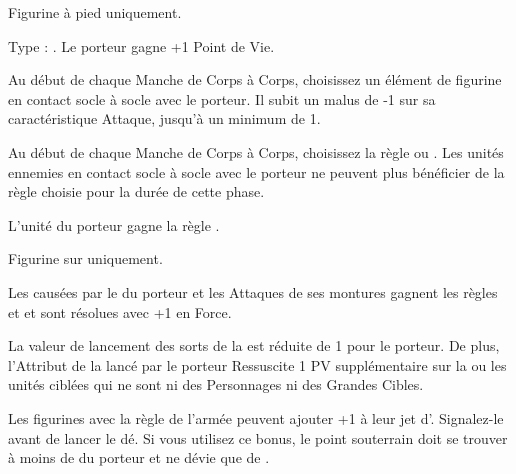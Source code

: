 Figurine à pied uniquement.

Type : \platearmour{}. Le porteur gagne +1 Point de Vie.

\endpricelist

\armytalismans

\startpricelist

 Au début de chaque Manche de Corps à Corps, choisissez un élément de figurine en contact socle à socle avec le porteur. Il subit un malus de -1 sur sa caractéristique Attaque, jusqu'à un minimum de 1.

\endpricelist

\armyenchanteditems

\startpricelist

 Au début de chaque Manche de Corps à Corps, choisissez la règle \inspiringpresence{} ou \holdyourground{}. Les unités ennemies en contact socle à socle avec le porteur ne peuvent plus bénéficier de la règle choisie pour la durée de cette phase.

 L'unité du porteur gagne la règle \hardtarget{}.

 Figurine sur \chariot{} uniquement.

Les \impacthits{} causées par le \chariot{} du porteur et les Attaques de ses montures gagnent les règles \flamingattacks{} et \magicalattacks{} et sont résolues avec +1 en Force.

\endpricelist

\armyarcaneitems

\startpricelist

 La valeur de lancement des sorts de la \Pathof{} \sands{} est réduite de 1 pour le porteur. De plus, l'Attribut de la \Pathof{} \sands{} lancé par le porteur Ressuscite 1 PV supplémentaire sur la ou les unités ciblées qui ne sont ni des Personnages ni des Grandes Cibles.

\endpricelist

\armymagicalbanners

\startpricelist

 Les figurines avec la règle \undergroundambush{} de l'armée peuvent ajouter +1 à leur jet d'\ambush{}. Signalez-le avant de lancer le dé. Si vous utilisez ce bonus, le point souterrain doit se trouver à moins de  du porteur et ne dévie que de .

